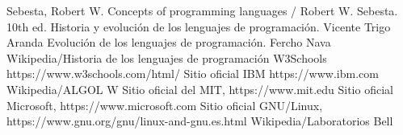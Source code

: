 \documentclass[twoside,twocolumn]{article}
\begin{document}
\begin{thebibliography}{99} %

\bibitem{}Sebesta, Robert W.
Concepts of programming languages / Robert W. Sebesta. 10th ed.
 Historia y evolución de los lenguajes de programación. Vicente Trigo Aranda
\bibitem{} Evolución de los lenguajes de programación. Fercho Nava 
 Wikipedia/Historia de los lenguajes de programación
  W3Schools https://www.w3schools.com/html/
 Sitio oficial IBM https://www.ibm.com
 Wikipedia/ALGOL W
 Sitio oficial del MIT, https://www.mit.edu
 Sitio oficial Microsoft, https://www.microsoft.com
 Sitio oficial GNU/Linux, https://www.gnu.org/gnu/linux-and-gnu.es.html
 Wikipedia/Laboratorios Bell
\end{thebibliography}

\end{document}
